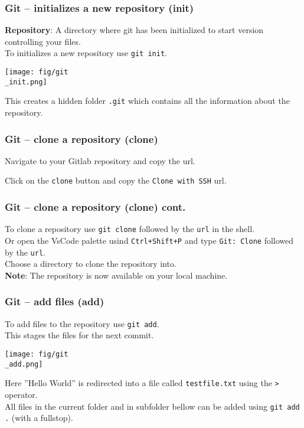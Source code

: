 \documentclass{beamer}
\begin{document}
\begin{frame}
  \frametitle{Git -- initializes a new repository (init)}
  \textbf{Repository}: A directory where git has been initialized to start version controlling your files.\\
  \vspace{5mm}
  To initializes a new repository use \texttt{git init}.\\
  \begin{center}
    \texttt{[image: fig/git\\\_init.png]}
   \end{center}
  This creates a hidden folder \texttt{.git} which contains all the information about the repository.\\
\end{frame}
\begin{frame}
  \frametitle{Git -- clone a repository (clone)}
  Navigate to your Gitlab repository and copy the url.\\
  \begin{minipage}[t]{0.48\textwidth}
    Click on the \texttt{clone} button and copy the \texttt{Clone with SSH} url.\\
    \end{minipage}
    \hfill 
    \begin{minipage}[t]{0.48\textwidth}
      \begin{center}
      \end{center}
  \end{minipage}
\end{frame}
\begin{frame}
  \frametitle{Git -- clone a repository (clone) cont.}
  To clone a repository use \texttt{git clone} followed by the \texttt{url} in the shell.\\
  \vspace{5mm}
  Or open the VsCode palette usind \texttt{Ctrl+Shift+P} and type \texttt{Git: Clone} followed by the \texttt{url}.\\
  \vspace{5mm}
  Choose a directory to clone the repository into.\\
  \vspace{5mm}
  \textbf{Note}: The repository is now available on your local machine.\\

\end{frame}
\begin{frame}
  \frametitle{Git -- add files (add)}
  To add files to the repository use \texttt{git add}.\\
  This stages the files for the next commit. 
  \begin{center}
    \texttt{[image: fig/git\\\_add.png]}
   \end{center}
  Here ''Hello World'' is redirected into a file called \texttt{testfile.txt} using the \texttt{>} operator.\\
  All files in the current folder and in subfolder bellow can be added using \texttt{git add .} (with a fullstop).\\
\end{frame}
\end{document}
